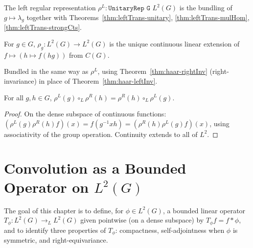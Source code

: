 \begin{definition}
  \label{def:leftReg}
  The left regular representation
  $\rho^L : \texttt{UnitaryRep G $L^2(G)$}$ is the bundling of
  $g \mapsto \lambda_g$ together with
  Theorems~\ref{thm:leftTrans-unitary},
  \ref{thm:leftTrans-mulHom}, \ref{thm:leftTrans-strongCts}.
\end{definition}

\begin{definition}
  \label{def:rightTransL2}
  For $g \in G$, $\rho_g : L^2(G) \to L^2(G)$ is the unique continuous
  linear extension of $f \mapsto (h \mapsto f(hg))$ from $C(G)$.
\end{definition}

\begin{definition}
  \label{def:rightReg}
  Bundled in the same way as $\rho^L$, using
  Theorem~\ref{thm:haar-rightInv} (right-invariance) in place of
  Theorem~\ref{thm:haar-leftInv}.
\end{definition}

\begin{theorem}
  \label{thm:LR-commute}
  For all $g, h \in G$, $\rho^L(g) \circ_L \rho^R(h) = \rho^R(h) \circ_L \rho^L(g)$.
\end{theorem}

\begin{proof}
  On the dense subspace of continuous functions:
  $(\rho^L(g)\rho^R(h)f)(x) = f(g^{-1} x h) = (\rho^R(h)\rho^L(g)f)(x)$,
  using associativity of the group operation. Continuity extends to all
  of $L^2$.
\end{proof}


\chapter{Convolution as a Bounded Operator on $L^2(G)$}
\label{chap:conv}

The goal of this chapter is to define, for $\phi \in L^2(G)$, a bounded
linear operator $T_\phi : L^2(G) \to_L L^2(G)$ given pointwise (on a
dense subspace) by $T_\phi f = f * \phi$, and to identify three properties
of $T_\phi$: compactness, self-adjointness when $\phi$ is symmetric,
and right-equivariance.

